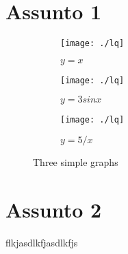 \section{Assunto 1}
\label{sec:ass1}
\lipsum[1]




\begin{figure}
    \centering
    \begin{subfigure}[b]{0.3\textwidth}
        \centering
        \texttt{[image: ./lq]}
        \caption{$y=x$}
        \label{fig:y equals x}
    \end{subfigure}
    \hfill
    \begin{subfigure}[b]{0.3\textwidth}
        \centering
        \texttt{[image: ./lq]}
        \caption{$y=3sinx$}
        \label{fig:three sin x}
    \end{subfigure}
    \hfill
    \begin{subfigure}[b]{0.3\textwidth}
        \centering
        \texttt{[image: ./lq]}
        \caption{$y=5/x$}
        \label{fig:five over x}
    \end{subfigure}
       \caption{Three simple graphs}
       \label{fig:three graphs}
\end{figure}


\section{Assunto 2}
\label{sec:ass2}
flkjasdlkfjasdlkfjs


